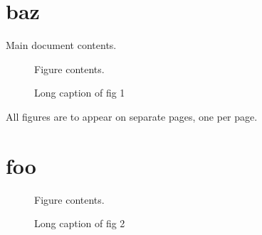 \documentclass{scrartcl}
\begin{document}
\section{baz}
  Main document contents.
\lipsum
\begin{figure}[p]
 \centerline{ Figure contents. }
\caption[Short caption]{Long caption of fig 1}\label{fig:1}
\end{figure}

\lipsum

All figures are to appear on separate pages, one per page.
\lipsum

\section{foo}
\lipsum
\begin{figure}[p]
 \centerline{ Figure contents. }
\caption[Short caption]{Long caption  of fig 2}\label{fig:2}
\end{figure}

\lipsum
\end{document}
